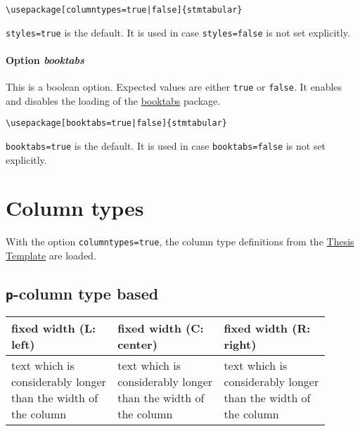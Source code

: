 \documentclass[%
  type=article,%
  layout=koma,%
  date=true,%
  hyperref=true,%
  listings=true,%
  math=true,%
]{stmtext}
\begin{document}
\begin{verbatim}
\usepackage[columntypes=true|false]{stmtabular}
\end{verbatim}

\texttt{styles=true} is the default. It is used in case \texttt{styles=false} is not set explicitly.

\paragraph{Option \protect\textit{booktabs}} 
\label{sec:usage:preamble:wholepackage:options:booktabs}

This is a boolean option. Expected values are either \texttt{true} or \texttt{false}. It enables and disables the loading of the \href{https://ctan.org/pkg/booktabs}{booktabs} package.

\begin{verbatim}
\usepackage[booktabs=true|false]{stmtabular}
\end{verbatim}

\texttt{booktabs=true} is the default. It is used in case \texttt{booktabs=false} is not set explicitly.

\section{Column types}

With the option \texttt{columntypes=true}, the column type definitions from the \href{http://www.matthiaspospiech.de/files/latex/vorlagen/thesis/TemplateDocumentation.pdf#subsection.7.4.12}{Thesis Template} are loaded.

\subsection{\protect\texttt{p}-column type based}

\begin{table}[htbp]
\begin{tabular}{L{0.3\linewidth}C{0.3\linewidth}R{0.3\linewidth}}
\toprule
fixed width (L: left)   &
fixed width (C: center) &
fixed width (R: right)  \\
\midrule
%
text which is considerably longer than the width of the column &
text which is considerably longer than the width of the column &
text which is considerably longer than the width of the column \\
\bottomrule
\end{tabular}
\end{table}
\end{document}
